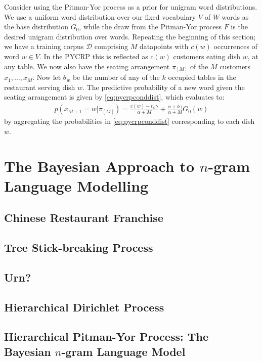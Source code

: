 Consider using the Pitman-Yor process as a prior for unigram word distributions. We use a uniform word distribution over our fixed vocabulary $V$ of $W$ words as the base distribution $G_0$, while the draw from the Pitman-Yor process $F$ is the desired unigram distribution over words. Repeating the beginning of this section; we have  a training corpus $\mathcal{D}$ comprising $M$ datapoints with $c(w)$ occurrences of word $w\in V$. In the PYCRP this is reflected as $c(w)$ customers eating dish $w$, at any table. We now also have the seating arrangement $\pi_{[M]}$ of the $M$ customers $x_1, \ldots, x_M$. Now let $\theta_w$ be the number of any of the $k$ occupied tables in the restaurant serving dish $w$. The predictive probability of a new word given the seating arrangement is given by \cref{eq:pycrpconddist}, which evaluates to:
\begin{align}
	p(x_{M+1} = w | \pi_{[M]}) = \frac{c(w)-t_w\gamma}{\alpha+M}+\frac{\alpha+k\gamma}{\alpha+M}G_0(w)
\end{align}
by aggregating the probabilities in \cref{eq:pycrpconddist} corresponding to each dish $w$. 

\section{The Bayesian Approach to $n$-gram Language Modelling}

\subsection{Chinese Restaurant Franchise}

\subsection{Tree Stick-breaking Process}

\subsection{Urn?}

\subsection{Hierarchical Dirichlet Process}

\subsection{Hierarchical Pitman-Yor Process: The Bayesian $n$-gram Language Model}



